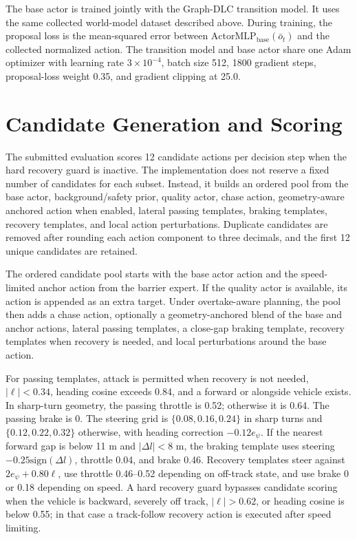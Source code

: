 \documentclass[journal]{IEEEtran}
\begin{document}
The base actor is trained jointly with the Graph-DLC transition model.
It uses the same collected world-model dataset described above. During
training, the proposal loss is the mean-squared error between
$\mathrm{ActorMLP}_{\mathrm{base}}(\bar{o}_t)$ and the collected
normalized action. The transition model and base actor share one Adam
optimizer with learning rate $3\times10^{-4}$, batch size 512, 1800
gradient steps, proposal-loss weight 0.35, and gradient clipping at
25.0.

\section{Candidate Generation and Scoring}
\label{supp:planning}

The submitted evaluation scores 12 candidate actions per decision step
when the hard recovery guard is inactive. The implementation does not
reserve a fixed number of candidates for each subset. Instead, it builds
an ordered pool from the base actor, background/safety prior, quality
actor, chase action, geometry-aware anchored action when enabled,
lateral passing templates, braking templates, recovery templates, and
local action perturbations. Duplicate candidates are removed after
rounding each action component to three decimals, and the first 12
unique candidates are retained.

The ordered candidate pool starts with the base actor action and the
speed-limited anchor action from the barrier expert. If the quality
actor is available, its action is appended as an extra target. Under
overtake-aware planning, the pool then adds a chase action, optionally
a geometry-anchored blend of the base and anchor actions, lateral
passing templates, a close-gap braking template, recovery templates
when recovery is needed, and local perturbations around the base action.

For passing templates, attack is permitted when recovery is not needed,
$|\ell|<0.34$, heading cosine exceeds 0.84, and a forward or alongside
vehicle exists. In sharp-turn geometry, the passing throttle is 0.52;
otherwise it is 0.64. The passing brake is 0. The steering grid is
$\{0.08,0.16,0.24\}$ in sharp turns and $\{0.12,0.22,0.32\}$ otherwise,
with heading correction $-0.12e_\psi$. If the nearest forward gap is
below 11 m and $|\Delta l|<8$ m, the braking template uses steering
$-0.25\mathrm{sign}(\Delta l)$, throttle 0.04, and brake 0.46.
Recovery templates steer against $2e_\psi+0.80\ell$, use throttle
0.46--0.52 depending on off-track state, and use brake 0 or 0.18
depending on speed. A hard recovery guard bypasses candidate scoring
when the vehicle is backward, severely off track, $|\ell|>0.62$, or
heading cosine is below 0.55; in that case a track-follow recovery
action is executed after speed limiting.
\end{document}
